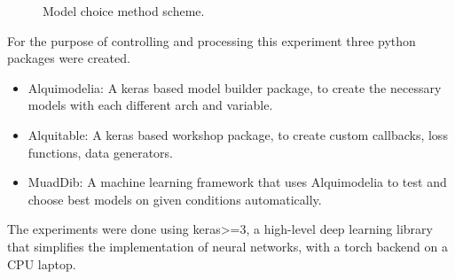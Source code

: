 \begin{figure}[H]
	\centering
	\resizebox{\linewidth}{!}{}
	\caption{Model choice method scheme.}
	\label{fig:method_training}
\end{figure}

For the purpose of controlling and processing this experiment three python packages were created.

\begin{itemize}
    \item Alquimodelia: A keras based model builder package, to create the necessary models with each different arch and variable.
    \item Alquitable: A keras based workshop package, to create custom callbacks, loss functions, data generators.
    \item MuadDib: A machine learning framework that uses Alquimodelia to test and choose best models on given conditions automatically.
\end{itemize}

The experiments were done using keras>=3, a high-level deep learning library that simplifies the implementation of neural networks, with a torch backend on a CPU laptop.





